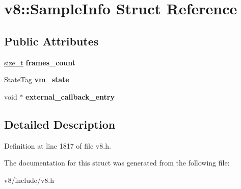 \hypertarget{structv8_1_1SampleInfo}{}\section{v8\+:\+:Sample\+Info Struct Reference}
\label{structv8_1_1SampleInfo}
\subsection*{Public Attributes}
\begin{DoxyCompactItemize}
\item 
\mbox{\label{structv8_1_1SampleInfo_a5f1e51bc358605e0c1d38fb2f3d344cd}} 
\mbox{\hyperlink{classsize__t}{size\+\_\+t}} {\bfseries frames\+\_\+count}
\item 
\mbox{\label{structv8_1_1SampleInfo_afd6198c9feb44a8df79576cf427b9a91}} 
State\+Tag {\bfseries vm\+\_\+state}
\item 
\mbox{\label{structv8_1_1SampleInfo_ac18636e309f00c66a68a29d78eaf355a}} 
void $\ast$ {\bfseries external\+\_\+callback\+\_\+entry}
\end{DoxyCompactItemize}


\subsection{Detailed Description}


Definition at line 1817 of file v8.\+h.



The documentation for this struct was generated from the following file\+:\begin{DoxyCompactItemize}
\item 
v8/include/v8.\+h\end{DoxyCompactItemize}
